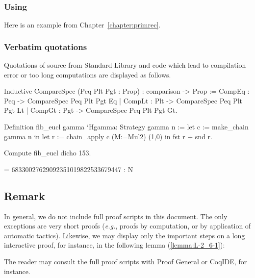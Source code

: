 \documentclass[twoside,a4paper]{book}
\newcounter{snippets}
\begin{document}
\subsubsection{Using \alectr}


Here is an example from Chapter~\ref{chapter:primrec}.

\vspace{4pt}




\subsubsection{Verbatim quotations}

Quotations of \coq{} source  from Standard Library and code which lead to compilation error or too long computations are displayed as follows.

\begin{Coqsrc}
  Inductive CompareSpec (Peq Plt Pgt : Prop) :
  comparison -> Prop :=
    CompEq : Peq -> CompareSpec Peq Plt Pgt Eq
  | CompLt : Plt -> CompareSpec Peq Plt Pgt Lt
  | CompGt : Pgt -> CompareSpec Peq Plt Pgt Gt.
\end{Coqsrc}

\begin{Coqsrc}
Definition fib_eucl gamma `{Hgamma: Strategy gamma} n :=
  let c := make_chain gamma  n
  in let r := chain_apply c (M:=Mul2) (1,0) in
       fst r + snd r.

Compute fib_eucl dicho 153.
\end{Coqsrc}

\begin{Coqanswer}
    = 68330027629092351019822533679447
     : N
\end{Coqanswer}


 \subsection{Remark}
 
In general, we do not include full proof scripts in this document. The only exceptions are very short proofs (\emph{e.g.}, proofs by computation, or by application of automatic tactics). Likewise, we may display only the important steps on a long interactive proof, for instance, in the following lemma (\vref{lemma:L-2_6-1}):




The reader may consult the full proof scripts with Proof General or CoqIDE, for instance.
\end{document}
